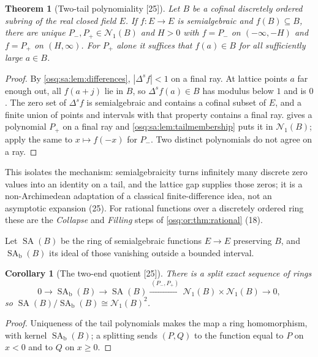 \documentclass[11pt,letterpaper]{article}
\numberwithin{equation}{section}
\newtheorem{theorem}{Theorem}[section]
\newtheorem{corollary}[corollary]{Corollary}
\theoremstyle{definition}
\theoremstyle{remark}
\theoremstyle{plain}
\newcommand{\Num}{\mathscr N}
\newcommand{\src}[1]{\textup{\textsf{[#1]}}}
\begin{document}
\begin{theorem}[Two-tail polynomiality \src{25}]\label{osq:sa:thm:tails}
Let $B$ be a cofinal discretely ordered subring of the real closed field $E$. If $f:E\to E$ is semialgebraic and $f(B)\subseteq B$, there are unique
$P_-,P_+\in\Num_1(B)$ and $H>0$ with $f=P_-$ on $(-\infty,-H)$ and $f=P_+$ on $(H,\infty)$. For $P_+$ alone it suffices that $f(a)\in B$ for all
sufficiently large $a\in B$.
\end{theorem}
\begin{proof}
By \cref{osq:sa:lem:differences}, $|\Delta^sf|<1$ on a final ray. At lattice points $a$ far enough out, all $f(a+j)$ lie in $B$, so $\Delta^sf(a)\in B$
has modulus below $1$ and is $0$. The zero set of $\Delta^sf$ is semialgebraic and contains a cofinal subset of $E$, and a finite union of points and
intervals with that property contains a final ray.  gives a polynomial $P_+$ on a final ray and \cref{osq:sa:lem:tailmembership}
puts it in $\Num_1(B)$; apply the same to $x\mapsto f(-x)$ for $P_-$. Two distinct polynomials do not agree on a ray.
\end{proof}

This isolates the mechanism: semialgebraicity turns infinitely many discrete zero values into an identity on a tail, and the lattice gap supplies those
zeros; it is a non-Archimedean adaptation of a classical finite-difference idea, not an asymptotic expansion (25). For rational functions over a
discretely ordered ring these are the \emph{Collapse} and \emph{Filling} steps of \cref{osq:or:thm:rational} (18).

Let $\operatorname{SA}(B)$ be the ring of semialgebraic functions $E\to E$ preserving $B$, and $\operatorname{SA}_{\mathrm b}(B)$ its ideal of those
vanishing outside a bounded interval.

\begin{corollary}[The two-end quotient \src{25}]\label{osq:sa:cor:germs}
There is a split exact sequence of rings
\begin{equation}\label{osq:sa:eq:germs}
 0\longrightarrow\operatorname{SA}_{\mathrm b}(B)\longrightarrow\operatorname{SA}(B)\xrightarrow{\ (P_-,P_+)\ }\Num_1(B)\times\Num_1(B)
 \longrightarrow0,
\end{equation}
so $\operatorname{SA}(B)/\operatorname{SA}_{\mathrm b}(B)\cong\Num_1(B)^2$.
\end{corollary}
\begin{proof}
Uniqueness of the tail polynomials makes the map a ring homomorphism, with kernel $\operatorname{SA}_{\mathrm b}(B)$; a splitting sends $(P,Q)$ to the
function equal to $P$ on $x<0$ and to $Q$ on $x\ge0$.
\end{proof}
\end{document}
